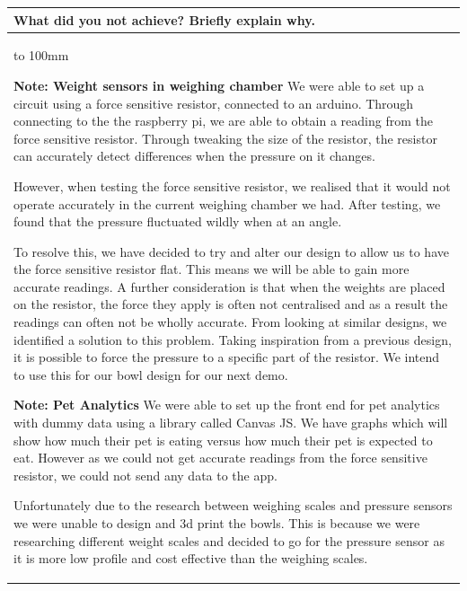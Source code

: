 \documentclass[a4paper]{article}
\newcommand{\colWidth}{141mm}
\begin{document}
\begin{center}
\begin{tabular}{|p{\colWidth}|}
	\hline
	\cellcolor{blue!25}\large
	\textbf{What did you not achieve? Briefly explain why.}
	\\ \hline
	\vtop to 100mm{
\textbf{Note: Weight sensors in weighing chamber}
We were able to set up a circuit using a force sensitive resistor, connected to an arduino. Through connecting to the the raspberry pi, we are able to obtain a reading from the force sensitive resistor. Through tweaking the size of the resistor, the resistor can accurately detect differences when the pressure on it changes. \par
However, when testing the force sensitive resistor, we realised that it would not operate accurately in the current weighing chamber we had. After testing, we found that the pressure fluctuated wildly when at an angle. \par
To resolve this, we have decided to try and alter our design to allow us to have the force sensitive resistor flat. This means we will be able to gain more accurate readings. A further consideration is that when the weights are placed on the resistor, the force they apply is often not centralised and as a result the readings can often not be wholly accurate. From looking at similar designs, we identified a solution to this problem. Taking inspiration from a previous design, it is possible to force the pressure to a specific part of the resistor. We intend to use this for our bowl design for our next demo. 
\par
\par
\vspace{5mm}
\textbf{Note: Pet Analytics}
We were able to set up the front end for pet analytics with dummy data using a library called Canvas JS. We have graphs which will show how much their pet is eating versus  how much their pet is expected to eat. However as we could not get accurate readings from the force sensitive resistor, we could not send any data to the app. \par
\par
\vspace{5mm}
Unfortunately due to the research between weighing scales and pressure sensors we were unable to design and 3d print the bowls. This is because we were researching different weight scales and decided to go for the pressure sensor as it is more low profile and cost effective than the weighing scales.

  }
  \\
  \hline
\end{tabular}
\vskip 5mm


\end{center}
\end{document}
